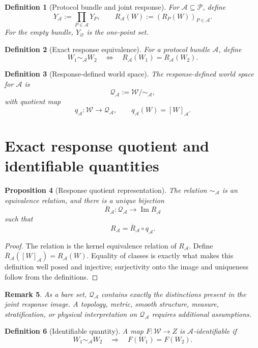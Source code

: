 \documentclass[11pt]{article}
\newtheorem{definition}{Definition}[section]
\newtheorem{proposition}[definition]{Proposition}
\newtheorem{remark}[definition]{Remark}
\newcommand{\W}{\mathcal W}
\newcommand{\Pcal}{\mathcal P}
\newcommand{\Acal}{\mathcal A}
\newcommand{\QA}{\mathcal Q_{\mathcal A}}
\begin{document}
\begin{definition}[Protocol bundle and joint response]
For $\Acal\subseteq\Pcal$, define
\[
Y_{\Acal}:=\prod_{P\in\Acal}Y_P,
\qquad
R_{\Acal}(W):=(R_P(W))_{P\in\Acal}.
\]
For the empty bundle, $Y_{\varnothing}$ is the one-point set.
\end{definition}

\begin{definition}[Exact response equivalence]
For a protocol bundle $\Acal$, define
\[
W_1\sim_{\Acal}W_2
\quad\Longleftrightarrow\quad
R_{\Acal}(W_1)=R_{\Acal}(W_2).
\]
\end{definition}

\begin{definition}[Response-defined world space]
The response-defined world space for $\Acal$ is
\[
\QA:=\W/\!\sim_{\Acal},
\]
with quotient map
\[
q_{\Acal}:\W\to\QA,
\qquad
q_{\Acal}(W)=[W]_{\Acal}.
\]
\end{definition}

\section{Exact response quotient and identifiable quantities}

\begin{proposition}[Response quotient representation]\label{prop:quotient}
The relation $\sim_{\Acal}$ is an equivalence relation, and there is a unique
bijection
\[
\overline R_{\Acal}:\QA\longrightarrow\operatorname{Im}R_{\Acal}
\]
such that
\[
R_{\Acal}=\overline R_{\Acal}\circ q_{\Acal}.
\]
\end{proposition}

\begin{proof}
The relation is the kernel equivalence relation of $R_{\Acal}$. Define
$\overline R_{\Acal}([W]_{\Acal})=R_{\Acal}(W)$. Equality of classes is exactly
what makes this definition well posed and injective; surjectivity onto the
image and uniqueness follow from the definitions.
\end{proof}

\begin{remark}
As a bare set, $\QA$ contains exactly the distinctions present in the joint
response image. A topology, metric, smooth structure, measure, stratification,
or physical interpretation on $\QA$ requires additional assumptions.
\end{remark}

\begin{definition}[Identifiable quantity]
A map $F:\W\to Z$ is \emph{$\Acal$-identifiable} if
\[
W_1\sim_{\Acal}W_2
\quad\Longrightarrow\quad
F(W_1)=F(W_2).
\]
\end{definition}
\end{document}
